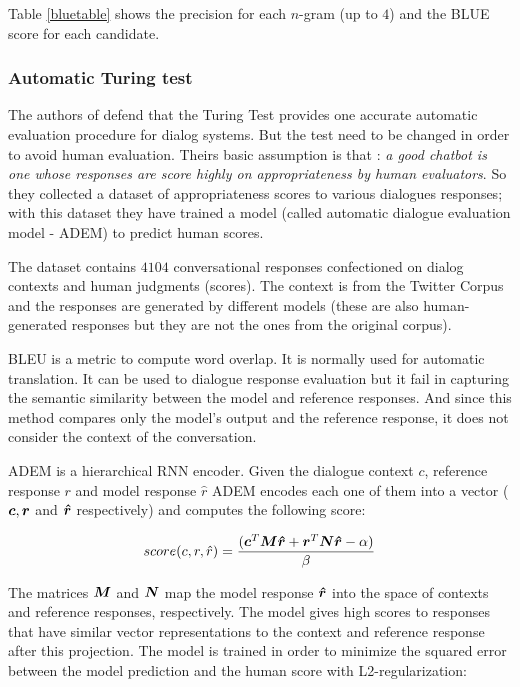 Table \ref{bluetable} shows the precision for each $n$-gram (up to $4$) and the BLUE score for each candidate.



\subsubsection{Automatic Turing test}

The authors of \cite{Lowe:2016} defend that the Turing Test \cite{Turing} provides one accurate automatic evaluation procedure for dialog systems. But the test need to be changed in order to avoid human evaluation. Theirs basic assumption is that : \textit{a good chatbot is one whose responses are score highly on appropriateness by human evaluators}. So they collected a dataset of appropriateness scores to various dialogues responses; with this dataset they have trained a model (called automatic dialogue evaluation model - ADEM) to predict human scores.

\par The dataset contains $4104$ conversational responses confectioned on dialog contexts and human judgments (scores). The context is from the Twitter Corpus and the responses are generated by different models (these are also human-generated responses but they are not the ones from the original corpus).

\par BLEU is a metric to compute word overlap. It is normally used for automatic translation. It can be used to dialogue response evaluation but it fail in capturing the semantic similarity between the model and reference responses. And since this method compares only the model's output and the reference response, it does not consider the context of the conversation.

\par ADEM is a hierarchical RNN encoder. Given the dialogue context $c$, reference response $r$ and model response $\hat{r}$ ADEM encodes each one of them into a vector ($\bm{c}, \bm{r}$ and $\bm{\hat{r}}$ respectively) and computes the following score:

\begin{equation}
score(c,r,\hat{r}) = \frac{(\bm{c}^{T} \bm{M} \bm{\hat{r}} + \bm{r}^{T} \bm{N} \bm{\hat{r}} - \alpha)}{\beta}
\end{equation}

\par The matrices $\bm{M}$ and $\bm{N}$ map the model response $\bm{\hat{r}}$ into the space of contexts and reference responses, respectively. The model gives high scores to responses that have similar vector representations to the context and reference response after this projection. The model is trained in order to minimize the squared error between the model prediction and the human score with L2-regularization:


